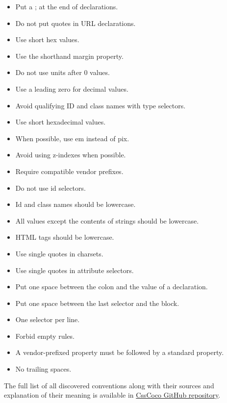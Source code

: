 \begin{itemize} 
\item Put a ; at the end of declarations. 
\item Do not put quotes in URL declarations.
\item Use short hex values.
\item Use the shorthand margin property.
\item Do not use units after 0 values.
\item Use a leading zero for decimal values.
\item Avoid qualifying ID and class names with type selectors. 
\item Use short hexadecimal values. 
\item When possible, use em instead of pix. 
\item Avoid using z-indexes when possible. 
\item Require compatible vendor prefixes. 
\item Do not use id selectors. 
\item Id and class names should be lowercase.
\item All values except the contents of strings should be lowercase.  
\item HTML tags should be lowercase.
\item Use single quotes in charsets.
\item Use single quotes in attribute selectors.
\item Put one space between the colon and the value of a declaration.
\item Put one space between the last selector and the block.
\item One selector per line.
\item Forbid empty rules.
\item A vendor-prefixed property must be followed by a standard property.
\item No trailing spaces.
\end{itemize}

The full list of all discovered conventions along with their sources and explanation of their meaning is available in \href{https://github.com/boryanagoncharenko/CssCoco/blob/master/analysis.md}{CssCoco GitHub repository}.

